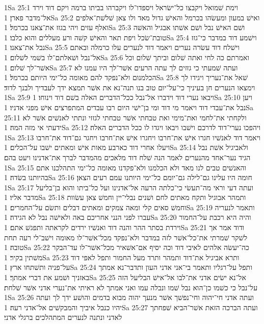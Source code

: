 1Sa 25:1  וימת שׁמואל ויקבצו כל־ישׂראל ויספדו־לו ויקברהו בביתו ברמה ויקם דוד וירד אל־מדבר פארן׃
1Sa 25:2  ואישׁ במעון ומעשׂהו בכרמל והאישׁ גדול מאד ולו צאן שׁלשׁת־אלפים ואלף עזים ויהי בגזז את־צאנו בכרמל׃
1Sa 25:3  ושׁם האישׁ נבל ושׁם אשׁתו אבגיל והאשׁה טובת־שׂכל ויפת תאר והאישׁ קשׁה ורע מעללים והוא כלבו׃
1Sa 25:4  וישׁמע דוד במדבר כי־גזז נבל את־צאנו׃
1Sa 25:5  וישׁלח דוד עשׂרה נערים ויאמר דוד לנערים עלו כרמלה ובאתם אל־נבל ושׁאלתם־לו בשׁמי לשׁלום׃
1Sa 25:6  ואמרתם כה לחי ואתה שׁלום וביתך שׁלום וכל אשׁר־לך שׁלום׃
1Sa 25:7  ועתה שׁמעתי כי גזזים לך עתה הרעים אשׁר־לך היו עמנו לא הכלמנום ולא־נפקד להם מאומה כל־ימי היותם בכרמל׃
1Sa 25:8  שׁאל את־נעריך ויגידו לך וימצאו הנערים חן בעיניך כי־על־יום טוב בנו תנה־נא את אשׁר תמצא ידך לעבדיך ולבנך לדוד׃
1Sa 25:9  ויבאו נערי דוד וידברו אל־נבל ככל־הדברים האלה בשׁם דוד וינוחו׃
1Sa 25:10  ויען נבל את־עבדי דוד ויאמר מי דוד ומי בן־ישׁי היום רבו עבדים המתפרצים אישׁ מפני אדניו׃
1Sa 25:11  ולקחתי את־לחמי ואת־מימי ואת טבחתי אשׁר טבחתי לגזזי ונתתי לאנשׁים אשׁר לא ידעתי אי מזה המה׃
1Sa 25:12  ויהפכו נערי־דוד לדרכם וישׁבו ויבאו ויגדו לו ככל הדברים האלה׃
1Sa 25:13  ויאמר דוד לאנשׁיו חגרו אישׁ את־חרבו ויחגרו אישׁ את־חרבו ויחגר גם־דוד את־חרבו ויעלו אחרי דוד כארבע מאות אישׁ ומאתים ישׁבו על־הכלים׃
1Sa 25:14  ולאביגיל אשׁת נבל הגיד נער־אחד מהנערים לאמר הנה שׁלח דוד מלאכים מהמדבר לברך את־אדנינו ויעט בהם׃
1Sa 25:15  והאנשׁים טבים לנו מאד ולא הכלמנו ולא־פקדנו מאומה כל־ימי התהלכנו אתם בהיותנו בשׂדה׃
1Sa 25:16  חומה היו עלינו גם־לילה גם־יומם כל־ימי היותנו עמם רעים הצאן׃
1Sa 25:17  ועתה דעי וראי מה־תעשׂי כי־כלתה הרעה אל־אדנינו ועל כל־ביתו והוא בן־בליעל מדבר אליו׃
1Sa 25:18  ותמהר אבוגיל ותקח מאתים לחם ושׁנים נבלי־יין וחמשׁ צאן עשׂוות וחמשׁ סאים קלי ומאה צמקים ומאתים דבלים ותשׂם על־החמרים׃
1Sa 25:19  ותאמר לנעריה עברו לפני הנני אחריכם באה ולאישׁה נבל לא הגידה׃
1Sa 25:20  והיה היא רכבת על־החמור וירדת בסתר ההר והנה דוד ואנשׁיו ירדים לקראתה ותפגשׁ אתם׃
1Sa 25:21  ודוד אמר אך לשׁקר שׁמרתי את־כל־אשׁר לזה במדבר ולא־נפקד מכל־אשׁר־לו מאומה וישׁב־לי רעה תחת טובה׃
1Sa 25:22  כה־יעשׂה אלהים לאיבי דוד וכה יסיף אם־אשׁאיר מכל־אשׁר־לו עד־הבקר משׁתין בקיר׃
1Sa 25:23  ותרא אביגיל את־דוד ותמהר ותרד מעל החמור ותפל לאפי דוד על־פניה ותשׁתחו ארץ׃
1Sa 25:24  ותפל על־רגליו ותאמר בי־אני אדני העון ותדבר־נא אמתך באזניך ושׁמע את דברי אמתך׃
1Sa 25:25  אל־נא ישׂים אדני את־לבו אל־אישׁ הבליעל הזה על־נבל כי כשׁמו כן־הוא נבל שׁמו ונבלה עמו ואני אמתך לא ראיתי את־נערי אדני אשׁר שׁלחת׃
1Sa 25:26  ועתה אדני חי־יהוה וחי־נפשׁך אשׁר מנעך יהוה מבוא בדמים והושׁע ידך לך ועתה יהיו כנבל איביך והמבקשׁים אל־אדני רעה׃
1Sa 25:27  ועתה הברכה הזאת אשׁר־הביא שׁפחתך לאדני ונתנה לנערים המתהלכים ברגלי אדני׃
